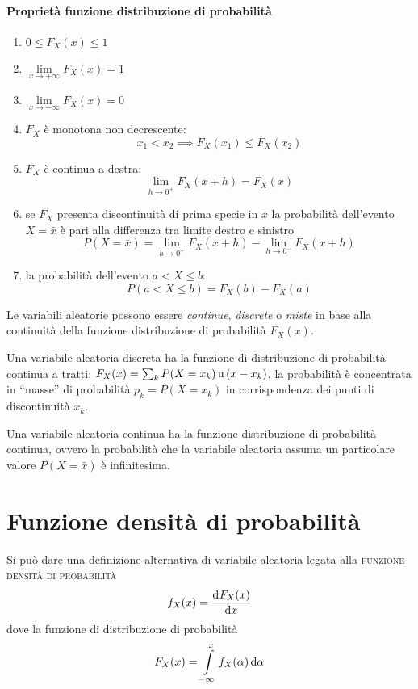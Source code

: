 \paragraph{Proprietà funzione distribuzione di probabilità}
\begin{enumerate}
\item $0\leq F_X(x)\leq 1$
\item $\lim\limits_{x\to+\infty}F_X(x)=1$
\item $\lim\limits_{x\to-\infty}F_X(x)=0$
\item $F_X$ è monotona non decrescente:
\[
	x_1<x_2\implies F_X(x_1)\leq F_X(x_2)
\]
\item $F_X$ è continua a destra:
\[
	\lim\limits_{h\to 0^+}{F_X(x+h)}=F_X(x)
\]
\item se $F_X$ presenta discontinuità di prima specie in $\bar{x}$ la probabilità dell'evento $X=\bar{x}$ è pari alla differenza tra limite destro e sinistro
\[
	P(X=\bar{x})=\lim\limits_{h\to 0^+}{F_X(x+h)} - \lim\limits_{h\to 0^-}{F_X(x+h)}
\]
\item la probabilità dell'evento $a < X \leq b$:
\[
	P(a<X\leq b)=F_X(b)-F_X(a)
\]
\end{enumerate}

Le variabili aleatorie possono essere \emph{continue}, \emph{discrete} o \emph{miste} in base alla continuità della funzione distribuzione di probabilità $F_X(x)$.

Una variabile aleatoria discreta ha la funzione di distribuzione di probabilità continua a tratti: $F_X(x)=\sum_k P(X=x_k)\operatorname{u}{(x-x_k)}$, la probabilità è concentrata in “masse” di probabilità $p_k=P(X=x_k)$ in corrispondenza dei punti di discontinuità $x_k$.

Una variabile aleatoria continua ha la funzione distribuzione di probabilità continua, ovvero la probabilità che la variabile aleatoria assuma un particolare valore $P(X=\bar{x})$ è infinitesima.

\section{Funzione densità di probabilità}
Si può dare una definizione alternativa di variabile aleatoria legata alla \textsc{funzione densità di probabilità}
\begin{equation}
\label{eq:funz_dens_prob}
	f_X(x)=\dfrac{\mathop{}\!\mathrm{d}^{}F_X(x)}{\mathop{}\!\mathrm{d} x^{}}
\end{equation}
dove la funzione di distribuzione di probabilità
\begin{equation}
	F_X(x)=\int\limits_{-\infty}^{x}{f_X(\alpha)}{\,\mathop{}\!\mathrm{d}{\alpha}}
\end{equation}


